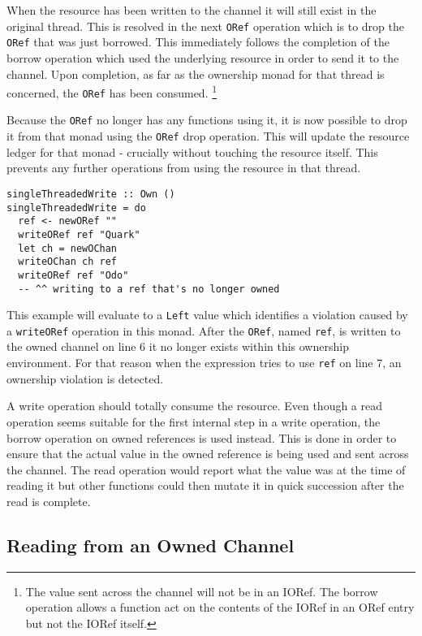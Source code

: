 \documentclass[onehalf,11pt]{beavtex}
\begin{document}
When the resource has been written to the channel it will still exist in the
original thread.
This is resolved in the next \texttt{ORef} operation which is to drop
the \texttt{ORef} that was just borrowed.
This immediately follows the completion of the borrow operation which used the
underlying resource in order to send it to the channel.
Upon completion, as far as the ownership monad for that thread is
concerned, the \texttt{ORef} has been consumed.
\footnote{The value sent across the channel will not be in an IORef.
  The borrow operation allows a function act on the contents of the IORef in
  an ORef entry but not the IORef itself.}

Because the \texttt{ORef} no longer has any functions using it, it is now
possible to drop it from that monad using the \texttt{ORef} drop operation.
This will update the resource ledger for that monad - crucially without
touching the resource itself.
This prevents any further operations from using the resource
in that thread.

\newpage

\begin{lstlisting}
singleThreadedWrite :: Own ()
singleThreadedWrite = do
  ref <- newORef ""
  writeORef ref "Quark"
  let ch = newOChan
  writeOChan ch ref
  writeORef ref "Odo"
  -- ^^ writing to a ref that's no longer owned
\end{lstlisting}

This example will evaluate to a \texttt{Left} value which identifies a
violation caused by a \texttt{writeORef} operation in this monad.
After the \texttt{ORef}, named \texttt{ref}, is written to the owned channel on
line 6 it no longer exists within this ownership environment.
For that reason when the expression tries to use \texttt{ref} on line 7, an
ownership violation is detected.

A write operation should totally consume the resource.
Even though a read operation seems suitable for the first internal step in a
write operation, the borrow operation on owned references is used instead.
This is done in order to ensure that the actual value in the owned reference is
being used and sent across the channel.
The read operation would report what the value was at the time of reading it but
other functions could then mutate it in quick succession after the read is
complete. %

\subsection{Reading from an Owned Channel}
\end{document}

